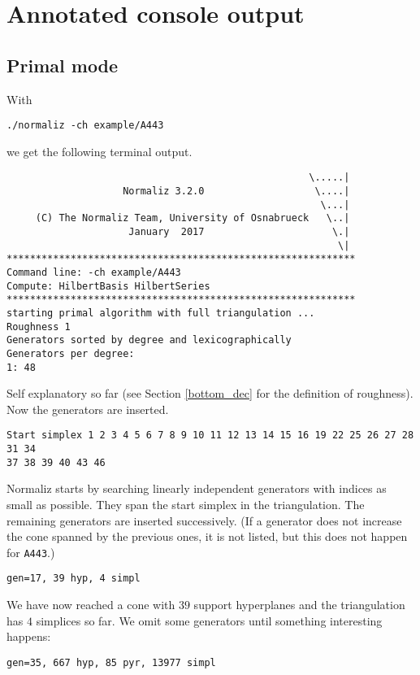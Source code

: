\documentclass[12pt,a4paper]{scrartcl}
\theoremstyle{definition}
\begin{document}
\section{Annotated console output}\label{Console}

\subsection{Primal mode}

With
\begin{Verbatim}
./normaliz -ch example/A443
\end{Verbatim}
we get the following terminal output.

\begin{Verbatim}
                                                    \.....|
                    Normaliz 3.2.0                   \....|
                                                      \...|
     (C) The Normaliz Team, University of Osnabrueck   \..|
                     January  2017                      \.|
                                                         \|
************************************************************
Command line: -ch example/A443 
Compute: HilbertBasis HilbertSeries 
************************************************************
starting primal algorithm with full triangulation ...
Roughness 1
Generators sorted by degree and lexicographically
Generators per degree:
1: 48 
\end{Verbatim}
Self explanatory so far (see Section \ref{bottom_dec} for the definition of roughness). Now the generators are inserted.
\begin{Verbatim}
Start simplex 1 2 3 4 5 6 7 8 9 10 11 12 13 14 15 16 19 22 25 26 27 28 31 34 
37 38 39 40 43 46 
\end{Verbatim}
Normaliz starts by searching linearly independent generators with indices as small as possible. They span the start simplex in the triangulation. The remaining generators are inserted successively. (If a generator does not increase the cone spanned by the previous ones, it is not listed, but this does not happen for \verb|A443|.)
\begin{Verbatim}
gen=17, 39 hyp, 4 simpl
\end{Verbatim}
We have now reached a cone with $39$ support hyperplanes and the triangulation has $4$  simplices so far. We omit some generators until something interesting happens:
\begin{Verbatim}
gen=35, 667 hyp, 85 pyr, 13977 simpl
\end{Verbatim}
\end{document}
